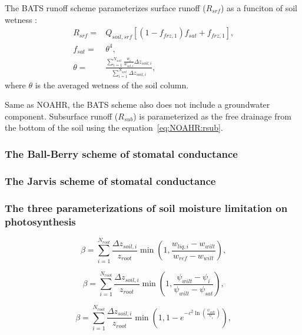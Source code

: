 \documentclass[essd]{copernicus}
\begin{document}
The BATS runoff scheme parameterizes surface runoff (\(R_{srf}\)) as a funciton
of soil wetness \citep{yang1996GPC}:
\begin{align}
    R_{srf} = & Q_{soil,srf} \left[ (1 - f_{frz,1}) f_{sat} + f_{frz,1} \right]
    \text{,} \\
    f_{sat} = & \theta^4 \text{,} \\
    \theta =  & \frac{\sum_{i=1}^{N_{soil}}\frac{w_i}{w_{sat,i}}\Delta
    z_{soil,i}}{\sum_{i=1}^{N_{soil}}\Delta z_{soil,i}} \text{,}
\end{align}
where \(\theta\) is the averaged wetness of the soil column.

Same as NOAHR, the BATS scheme also does not include a groundwater component.
Subsurface runoff (\(R_{sub}\)) is parameterized as the free drainage from the
bottom of the soil using the equation~\eqref{eq:NOAHR:rsub}.


\subsubsection{The Ball-Berry scheme of stomatal conductance}


\subsubsection{The Jarvis scheme of stomatal conductance}

\subsubsection{The three parameterizations of soil moisture limitation on
    photosynthesis}

\begin{equation}
    \beta = \sum_{i=1}^{N_{root}} \frac{\Delta z_{soil,i}}{z_{root}}
    \min\left(1, \frac{w_{liq,i} - w_{wilt}}{w_{ref} - w_{wilt}}\right)
    \text{,}
\end{equation}

\begin{equation}
    \beta = \sum_{i=1}^{N_{root}} \frac{\Delta z_{soil,i}}{z_{root}}
    \min\left(1, \frac{\psi_{wilt} - \psi_{i}}{\psi_{wilt} - \psi_{sat}}\right)
    \text{,}
\end{equation}

\begin{equation}
    \beta = \sum_{i=1}^{N_{root}} \frac{\Delta z_{soil,i}}{z_{root}}
    \min\left(1,
    1 - e^{-c^2 \ln\left(\frac{\psi_{wilt}}{\psi_{i}} \right)} \right) \text{,}
\end{equation}
\end{document}
